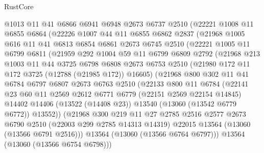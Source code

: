\begin{lexlean}{RustCore}
\begin{coremodule}
      @1013
      @11
      @41
      @6866
      @6941
      @6948
      @2673
      @6737
      @2510
      (@22221
        @1008
        @11
        @6855
        @6864
        (@22226
          @1007
          @44
          @11
          @6855
          @6862
          @2837
          (@21968
            @1005
            @616
            @11
            @41
            @6813
            @6854
            @6861
            @2673
            @6745
            @2510
            (@22221
              @1005
              @11
              @6799
              @6811
              (@21959
                @292
                @1004
                @59
                @11
                @6799
                @6809
                @2792
                (@21968
                  @213
                  @1003
                  @11
                  @44
                  @3725
                  @6798
                  @6808
                  @2673
                  @6753
                  @2510
                  (@21980 @172 @11 @172 @3725 (@12788 (@21985 @172)) @16605)
                  (@21968
                    @800
                    @302
                    @11
                    @41
                    @6784
                    @6797
                    @6807
                    @2673
                    @6763
                    @2510
                    (@22133
                      @800
                      @11
                      @6784
                      (@22141
                        @23
                        @60
                        @11
                        @2569
                        @2612
                        @6771
                        @6779
                        (@22151 @2569 @22154 @14845)
                        @14402
                        @14406
                        (@13522 (@14408 @23))
                        @13540
                        (@13060 (@13542 @6779 @6772))
                        @13552))
                    (@21968
                      @300
                      @219
                      @11
                      @27
                      @2785
                      @2516
                      @2577
                      @2673
                      @6790
                      @2510
                      (@22003 @299 @2785 @14313 @14319)
                      @22015
                      @13564
                      (@13060 (@13566 @6791 @2516)))
                    @13564
                    (@13060 (@13566 @6764 @6797)))
                  @13564
                  (@13060 (@13566 @6754 @6798)))

\end{coremodule}
\end{lexlean}
